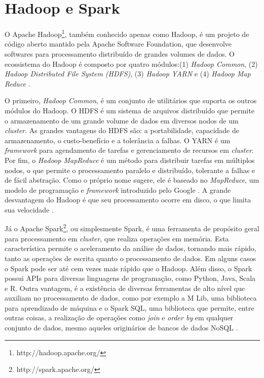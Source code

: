 \section{Hadoop e Spark}
\label{sec:spark}

O Apache Hadoop\footnote{http://hadoop.apache.org/}, também conhecido apenas como Hadoop, 
é um projeto de código aberto mantido pela Apache Software Foundation, que desenvolve 
softwares para processamento distribuído de grandes volumes de dados. O ecossistema do 
Hadoop é composto por quatro módulos:(1) \textit{Hadoop Common}, (2) 
\textit{Hadoop Distributed File System (HDFS)}, (3) \textit{Hadoop YARN} e (4) 
\textit{Hadoop Map Reduce} \cite{kumar2014apache}. 

O primeiro, \textit{Hadoop Common}, é um conjunto de utilitários que suporta os outros módulos
do Hadoop. O HDFS é um sistema de arquivos distribuído que permite o armazenamento de um 
grande volume de dados em diversos nodos de um \textit{cluster}. As grandes vantagens do HDFS 
são: a portabilidade, capacidade de armazenamento, o custo-benefício e a tolerância a falhas. 
O YARN é um \textit{framework} para agendamento de tarefas e gerenciamento de recursos em 
\textit{cluster}. Por fim, o \textit{Hadoop MapReduce} é um método para distribuir tarefas 
em múltiplos nodos, o que permite o processamento paralelo e distribuído, tolerante a 
falhas e de fácil abstração. Como o próprio nome sugere, ele é baseado no \textit{MapReduce}, 
um modelo de programação e \textit{framework} introduzido pelo Google \cite{kumar2014apache}. 
A grande desvantagem do Hadoop é que seu processamento ocorre em disco, o que limita sua 
velocidade \cite{shoro2015big}.

Já o Apache Spark\footnote{http://spark.apache.org/}, ou simplesmente Spark, é uma ferramenta 
de propósito geral para processamento em \textit{cluster}, que realiza operações em memória. 
Esta característica permite o aceleramento da análise de dados, tornando mais rápido, 
tanto as operações de escrita quanto o processamento de dados. Em alguns casos o Spark pode ser 
até cem vezes mais rápido que o Hadoop. Além disso, o Spark possui APIs para diversas 
linguagens de programação, como Python, Java, Scala e R. Outra vantagem, é a existência de 
diversas ferramentas de alto nível que auxiliam no processamento de dados, como por exemplo 
a M Lib, uma biblioteca para aprendizado de máquina e o Spark SQL, uma biblioteca que 
permite, entre outras coisas, a realização de operações como \textit{join} e 
\textit{order by} em qualquer conjunto de dados, mesmo aqueles originários de bancos de 
dados NoSQL \cite{shoro2015big}.

